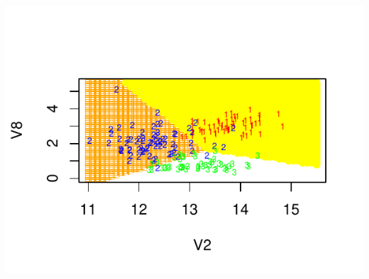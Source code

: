 \documentclass[10pt,a4paper]{article}\usepackage[]{graphicx}\usepackage[]{color}
\makeatletter
\def\maxwidth{ %
  \ifdim\Gin@nat@width>\linewidth
    \linewidth
  \else
    \Gin@nat@width
  \fi
}
\newenvironment{knitrout}{}{} %
\makeatother
\begin{document}
\begin{knitrout}
{\centering \includegraphics[width=\maxwidth]{figure/unnamed-chunk-6} 

}



\end{knitrout}
\end{document}
